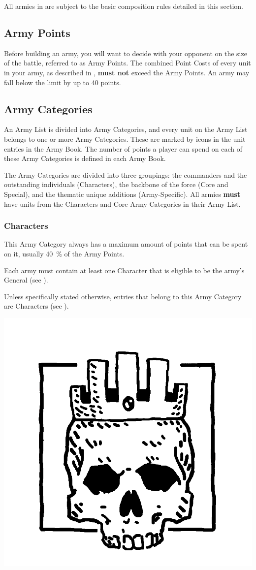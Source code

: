 All armies in \nameofthegame{} are subject to the basic composition rules detailed in this section.

\subsection{Army Points}
\label{army_points}

Before building an army, you will want to decide with your opponent on the size of the battle, referred to as Army Points. The combined Point Costs of every unit in your army, as described in , \textbf{must not} exceed the Army Points. An army may fall below the limit by up to 40 points.

\columnbreak

\subsection{Army Categories}
\label{army_categories}

An Army List is divided into Army Categories, and every unit on the Army List belongs to one or more Army Categories. These are marked by icons in the unit entries in the Army Book. The number of points a player can spend on each of these Army Categories is defined in each Army Book.

The Army Categories are divided into three groupings: the commanders and the outstanding individuals (Characters), the backbone of the force (Core and Special), and the thematic unique additions (Army-Specific). All armies \textbf{must} have units from the Characters and Core Army Categories in their Army List.

\subsubsection{Characters}

This Army Category always has a maximum amount of points that can be spent on it, usually \SI{40}{\percent} of the Army Points.

Each army must contain at least one Character that is eligible to be the army's General (see ).

Unless specifically stated otherwise, entries that belong to this Army Category are Characters (see ).

\vspace*{-10pt}
\begin{center}
\includegraphics[width=0.3\columnwidth]{../Layout/pics/logo_character.png}
\end{center}
\vspace*{-10pt}

